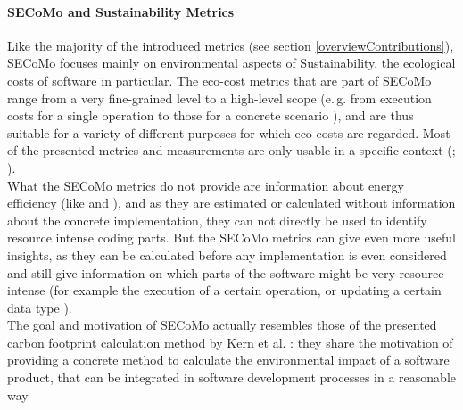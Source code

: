 \documentclass[oribibl]{llncs}
\begin{document}

\paragraph{SECoMo and Sustainability Metrics}
Like the majority of the introduced metrics (see section \ref{overviewContributions}), SECoMo focuses mainly on environmental aspects of Sustainability, the ecological costs of software in particular. The eco-cost metrics that are part of SECoMo range from a very fine-grained level to a high-level scope (e.\,g. from execution costs for a single operation to those for a concrete scenario \cite{schulze_cost_2016}), and are thus suitable for a variety of different purposes for which eco-costs are regarded. Most of the presented metrics and measurements are only usable in a specific context (\cite{naumann_how_2008}; \cite{capra_is_2012}).\\ %
What the SECoMo metrics do not provide are information about energy efficiency (like \cite{capra_is_2012} and \cite{johann_how_2012}), and as they are estimated or calculated without information about the concrete implementation, they can not directly be used to identify resource intense coding parts. But the SECoMo metrics can give even more useful insights, as they can be calculated before any implementation is even considered and still give information on which parts of the software might be very resource intense (for example the execution of a certain operation, or updating a certain data type \cite{schulze_cost_2016}).\\
The goal and motivation of SECoMo actually resembles those of the presented carbon footprint calculation method by Kern et al. \cite{kern_impacts_2015}: they share the motivation of providing a concrete method to calculate the environmental impact of a software product, that can be integrated in software development processes in a reasonable way %
\end{document}
